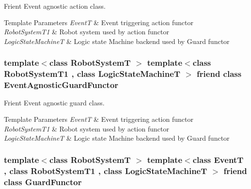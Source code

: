 Frient Event agnostic action class. 


\begin{DoxyTemplParams}{Template Parameters}
{\em Event\-T} & Event triggering action functor \\
\hline
{\em Robot\-System\-T1} & Robot system used by action functor \\
\hline
{\em Logic\-State\-Machine\-T} & Logic state Machine backend used by Guard functor \\
\hline
\end{DoxyTemplParams}
\hypertarget{classSampleLogicStateMachine___af372c36475bc4510af791f5cb66608ad}{
\subsubsection[{Event\-Agnostic\-Guard\-Functor}]{\setlength{\rightskip}{0pt plus 5cm}template$<$class Robot\-System\-T $>$ template$<$class Robot\-System\-T1 , class Logic\-State\-Machine\-T $>$ friend class {\bf Event\-Agnostic\-Guard\-Functor}\hspace{0.3cm}{\ttfamily [friend]}}}\label{classSampleLogicStateMachine___af372c36475bc4510af791f5cb66608ad}


Frient Event agnostic guard class. 


\begin{DoxyTemplParams}{Template Parameters}
{\em Event\-T} & Event triggering action functor \\
\hline
{\em Robot\-System\-T1} & Robot system used by action functor \\
\hline
{\em Logic\-State\-Machine\-T} & Logic state Machine backend used by Guard functor \\
\hline
\end{DoxyTemplParams}
\hypertarget{classSampleLogicStateMachine___a9411581bb37b54467df520e3c73ceaf0}{
\subsubsection[{Guard\-Functor}]{\setlength{\rightskip}{0pt plus 5cm}template$<$class Robot\-System\-T $>$ template$<$class Event\-T , class Robot\-System\-T1 , class Logic\-State\-Machine\-T $>$ friend class {\bf Guard\-Functor}\hspace{0.3cm}{\ttfamily [friend]}}}\label{classSampleLogicStateMachine___a9411581bb37b54467df520e3c73ceaf0}


